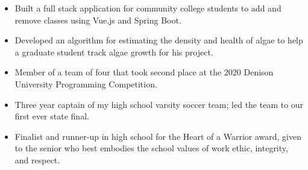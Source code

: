 




\begin{itemize}
    \item Built a full stack application for community college students to add and remove classes using Vue.js and Spring Boot.
    \item Developed an algorithm for estimating the density and health of algae to help a graduate student track algae growth for his project.
\end{itemize}

\smallskip
\begin{itemize}
\item Member of a team of four that took second place at the 2020 Denison University Programming Competition.
\item Three year captain of my high school varsity soccer team; led the team to our first ever state final.
\item Finalist and runner-up in high school for the Heart of a Warrior award, given to the senior who best embodies the school values of work ethic, integrity, and respect.
\end{itemize}
\cvproject{}
